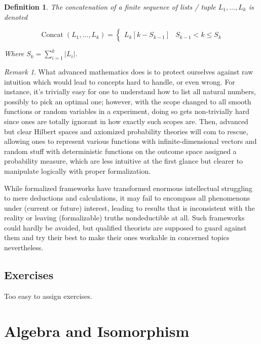 \documentclass{book}
\newtheorem{definition}{Definition}
\theoremstyle{definition}\newtheorem{mechanism}{Mechanism}
\theoremstyle{remark}\newtheorem*{remark}{Remark}
\begin{document}
\begin{definition}
	The concatenation of a finite sequence of lists / tuple $L_1, \dots, L_k$ is denoted
	
	\begin{equation*}
		\operatorname{Concat}(L_1, \dots, L_k) = \begin{cases}
			L_k[k - S_{k - 1}] & S_{k - 1}< k \le S_{k}
		\end{cases}
	\end{equation*}
	
	Where $S_k = \sum_{i = 1}^{k} |L_i|$.
\end{definition}

\begin{remark}
	What advanced mathematics does is to protect ourselves against raw intuition which would lead to concepts hard to handle, or even wrong. For instance, it's trivially easy for one to understand how to list all natural numbers, possibly to pick an optimal one; however, with the scope changed to all smooth functions or random variables in a experiment, doing so gets non-trivially hard since ones are totally ignorant in how exactly such scopes are. Then, advanced but clear Hilbert spaces and axiomized probability theories will com to rescue, allowing ones to represent various functions with infinite-dimensional vectors and random stuff with deterministic functions on the outcome space assigned a probability measure, which are less intuitive at the first glance but clearer to manipulate logically with proper formalization.
	
	While formalized frameworks have transformed enormous intellectual struggling to mere deductions and calculations, it may fail to encompass all phenomenons under (current or future) interest, leading to results that is inconsistent with the reality or leaving (formalizable) truths nondeductible at all. Such frameworks could hardly be avoided, but qualified theorists are supposed to guard against them and try their best to make their ones workable in concerned topics nevertheless.
\end{remark}

\subsection*{Exercises}

Too easy to assign exercises.

\section{Algebra and Isomorphism}
\end{document}
